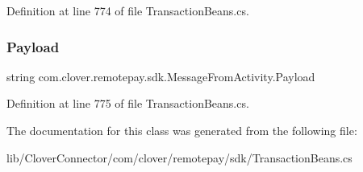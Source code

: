 Definition at line 774 of file Transaction\+Beans.\+cs.

\mbox{\label{classcom_1_1clover_1_1remotepay_1_1sdk_1_1_message_from_activity_afda5117692366e455d859d165f798243}} 
\subsubsection{\texorpdfstring{Payload}{Payload}}
{\footnotesize\ttfamily string com.\+clover.\+remotepay.\+sdk.\+Message\+From\+Activity.\+Payload}



Definition at line 775 of file Transaction\+Beans.\+cs.



The documentation for this class was generated from the following file\+:\begin{DoxyCompactItemize}
\item 
lib/\+Clover\+Connector/com/clover/remotepay/sdk/Transaction\+Beans.\+cs\end{DoxyCompactItemize}
